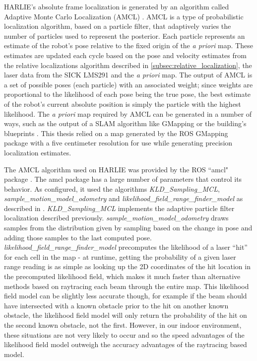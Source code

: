 HARLIE's absolute frame localization is generated by an algorithm called Adaptive Monte Carlo Localization (AMCL) \autocites{Dellaert_1999_533}{Fox01122003}{ProbRobotics}. AMCL is a type of probabilistic localization algorithm, based on a particle filter, that adaptively varies the number of particles used to represent the posterior. Each particle represents an estimate of the robot's pose relative to the fixed origin of the \emph{a priori} map. These estimates are updated each cycle based on the pose and velocity estimates from the relative localizations algorithm described in \autoref{subsec:relative_localization}, the laser data from the SICK LMS291 and the \emph{a priori} map. The output of AMCL is a set of possible poses (each particle) with an associated weight; since weights are proportional to the likelihood of each pose being the true pose, the best estimate of the robot's current absolute position is simply the particle with the highest likelihood. The \emph{a priori} map required by AMCL can be generated in a number of ways, such as the output of a SLAM algorithm like GMapping \autocite{Grisetti07improvedtechniques} or the building's blueprints \autocite{Fish2012}. This thesis relied on a map generated by the ROS GMapping package with a five centimeter resolution for use while generating precision localization estimates.

The AMCL algorithm used on HARLIE was provided by the ROS ``amcl" package \autocite{AMCLWiki}. The amcl package has a large number of parameters that control its behavior. As configured, it used the algorithms \emph{KLD\_Sampling\_MCL}, \emph{sample\_motion\_model\_odom\-etry} and \emph{like\-lihood\_field\_range\_finder\_model} as described in \autocite{ProbRobotics}. \emph{KLD\_Sampling\_MCL} implements the adaptive particle filter localization described previously. \emph{sample\_mo\-tion\_model\_odom\-etry} draws samples from the distribution given by sampling based on the change in pose and adding those samples to the last computed pose. \emph{like\-lihood\_field\_range\_finder\_model} precomputes the likelihood of a laser ``hit'' for each cell in the map - at runtime, getting the probability of a given laser range reading is as simple as looking up the 2D coordinates of the hit location in the precomputed likelihood field, which makes it much faster than alternative methods based on raytracing each beam through the entire map. This likelihood field model can be slightly less accurate though, for example if the beam should have intersected with a known obstacle prior to the hit on another known obstacle, the likelihood field model will only return the probability of the hit on the second known obstacle, not the first. However, in our indoor environment, these situations are not very likely to occur and so the speed advantages of the likelihood field model outweigh the accuracy advantages of the raytracing based model.

